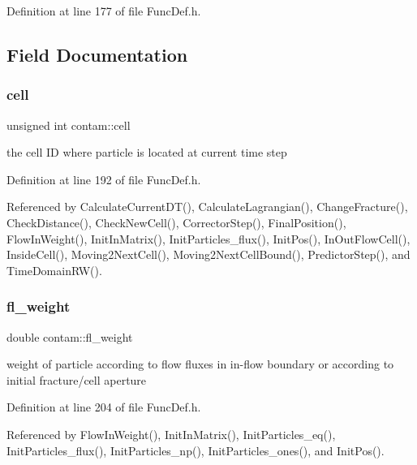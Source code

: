 Definition at line 177 of file Func\+Def.\+h.



\subsection{Field Documentation}
\mbox{\label{structcontam_a858c05f3221a70f6e212c1e7e172252c}} 
\subsubsection{\texorpdfstring{cell}{cell}}
{\footnotesize\ttfamily unsigned int contam\+::cell}

the cell ID where particle is located at current time step 

Definition at line 192 of file Func\+Def.\+h.



Referenced by Calculate\+Current\+D\+T(), Calculate\+Lagrangian(), Change\+Fracture(), Check\+Distance(), Check\+New\+Cell(), Corrector\+Step(), Final\+Position(), Flow\+In\+Weight(), Init\+In\+Matrix(), Init\+Particles\+\_\+flux(), Init\+Pos(), In\+Out\+Flow\+Cell(), Inside\+Cell(), Moving2\+Next\+Cell(), Moving2\+Next\+Cell\+Bound(), Predictor\+Step(), and Time\+Domain\+R\+W().

\mbox{\label{structcontam_ad50f20b01e37af1fedfd7bbe0cd1d7e3}} 
\subsubsection{\texorpdfstring{fl\_weight}{fl\_weight}}
{\footnotesize\ttfamily double contam\+::fl\+\_\+weight}

weight of particle according to flow fluxes in in-\/flow boundary or according to initial fracture/cell aperture 

Definition at line 204 of file Func\+Def.\+h.



Referenced by Flow\+In\+Weight(), Init\+In\+Matrix(), Init\+Particles\+\_\+eq(), Init\+Particles\+\_\+flux(), Init\+Particles\+\_\+np(), Init\+Particles\+\_\+ones(), and Init\+Pos().

\mbox{\label{structcontam_a0b9253ce268d781958145f9d110df2de}} 

